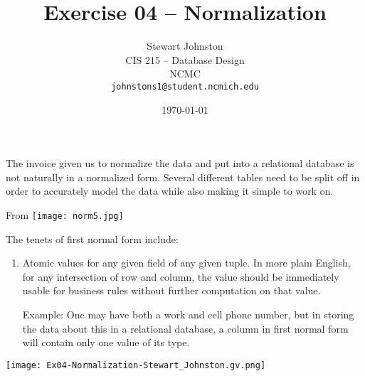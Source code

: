 \documentclass{article}
\title{Exercise 04 -- Normalization}
\author{Stewart Johnston\\
  {CIS 215 -- Database Design}\\
  {NCMC}\\
  {\texttt{johnstons1@student.ncmich.edu}}
}
\date{\today}
\begin{document}
\maketitle

The invoice given us to normalize the data and put into a relational
database is not naturally in a normalized form. Several different tables
need to be split off in order to accurately model the data while also
making it simple to work on.

From \texttt{[image: norm5.jpg]}

The tenets of first normal form include:
\begin{enumerate}
	\item Atomic values for any given field of any given tuple. In
		more plain English, for any intersection of row and
		column, the value should be immediately usable for
		business rules without further computation on that
		value.

		Example: One may have both a work and cell phone number,
		but in storing the data about this in a relational
		database, a column in first normal form will contain
		only one value of its type.
\end{enumerate}

\texttt{[image: Ex04-Normalization-Stewart\_Johnston.gv.png]}
\end{document}
